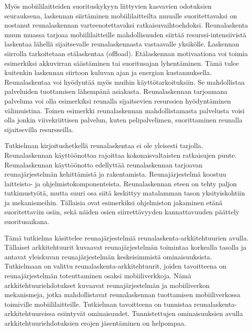Myös mobiililaitteiden suorituskykyyn liittyvien kasvavien odotuksien seurauksena, laskennan siirtäminen mobiililaitteilta muualle suoritettavaksi on nostanut reunalaskennan varteenotettavaksi ratkaisuvaihtoehdoksi.
Reunalaskenta muun muassa tarjoaa mobiililaitteille mahdollisuuden siirtää resurssi-intensiivistä laskentaa lähellä sijaitsevalle reunalaskennasta vastaavalle yksikölle. Laskennan siirrolla tarkoitetaan etälaskentaa (offload).
Etälaskennan motivaationa voi toimia esimerkiksi akkuvirran säästäminen tai suoritusajan lyhentäminen. Tämä tulee kuitenkin laskennan siirtoon kuluvan ajan ja energian kustannuksella. 
Reunalaskentaa voi hyödyntää myös muihin käyttötarkoituksiin.
Se mahdollistaa palveluiden tuottamisen lähempänä asiakasta.
Reunalaskennan tarjoamana palveluna voi olla esimerkiksi reunalla sijaitsevien resurssien hyödyntäminen välimuistina.
Toinen esimerkki reunalaskennan mahdollistamasta palvelusta voisi olla jonkin viivekriittisen palvelun, kuten pelipalvelimen, suorittaminen reunalla sijaitsevilla resursseilla.



Tutkielman kirjoitushetkellä reunalaskentaa ei ole yleisesti tarjolla.
Reunalaskennan käyttöönottoa rajoittaa kokonaisvaltaisten ratkaisujen puute.
Reunalaskennan käyttöönotto edellyttää reunalaskennan tarjoavan reunajärjestelmän kehittämistä ja rakentamista.
Reunajärjestelmä koostuu laitteisto- ja ohjelmistokomponenteista.
Reunalaskennan eteen on tehty paljon tutkimustyötä, mutta suuri osa siitä keskittyy matalamman tason yksityiskohtiin ja mekanismeihin. 
Tällaisia ovat esimerkiksi ohjelmiston jakaminen etänä suoritettaviin osiin, sekä näiden osien siirrettävyyden kannattavuuden päättely suoritusaikana. 

Tämä tutkielma käsittelee reunajärjestelmiä reunalaskenta\hyp arkkitehtuurien avulla. Tällaiset arkkitehtuurit kuvaavat reunajärjestelmän toimintaa korkealla tasolla ja antavat yleiskuvan reunajärjestelmän keskeisimmistä ominaisuuksista.
Tutkielmaan on valittu reunalaskenta\hyp arkkitehtuurit, joiden tavoitteena on reunajärjestelmän toteuttaminen osaksi mobiiliverkkoja.
Nämä arkkitehtuuriehdotukset kuvaavat reunajärjestelmän ja mobiiliverkon mekanismeja, jotka mahdollistavat reunalaskennan tuottamisen mobiiliverkossa toimiville mobiililaitteille.
Tutkielman tavoitteena on tunnistaa reunalaskenta\hyp arkkitehtuureissa esiintyvät ominaisuudet. Tunnistettujen ominaisuuksien avulla arkkitehtuuriehdotuksien erojen jäsentäminen on helpompaa. 

